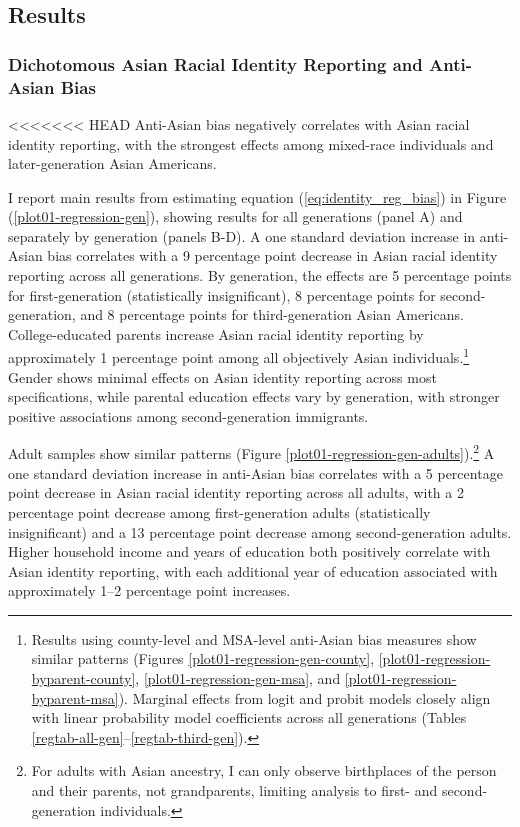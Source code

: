 \subsection{Results}\label{sec:results}

\subsubsection{Dichotomous Asian Racial Identity Reporting and Anti-Asian Bias}\label{sec:results-dichotomous}

<<<<<<< HEAD
Anti-Asian bias negatively correlates with Asian racial identity reporting, with the strongest effects among mixed-race individuals and later-generation Asian Americans.

I report main results from estimating equation (\ref{eq:identity_reg_bias}) in Figure (\ref{plot01-regression-gen}), showing results for all generations (panel A) and separately by generation (panels B-D). A one standard deviation increase in anti-Asian bias correlates with a 9 percentage point decrease in Asian racial identity reporting across all generations. By generation, the effects are 5 percentage points for first-generation (statistically insignificant), 8 percentage points for second-generation, and 8 percentage points for third-generation Asian Americans. College-educated parents increase Asian racial identity reporting by approximately 1 percentage point among all objectively Asian individuals.\footnote{Results using county-level and MSA-level anti-Asian bias measures show similar patterns (Figures \ref{plot01-regression-gen-county}, \ref{plot01-regression-byparent-county}, \ref{plot01-regression-gen-msa}, and \ref{plot01-regression-byparent-msa}). Marginal effects from logit and probit models closely align with linear probability model coefficients across all generations (Tables \ref{regtab-all-gen}--\ref{regtab-third-gen}).} Gender shows minimal effects on Asian identity reporting across most specifications, while parental education effects vary by generation, with stronger positive associations among second-generation immigrants.

Adult samples show similar patterns (Figure \ref{plot01-regression-gen-adults}).\footnote{For adults with Asian ancestry, I can only observe birthplaces of the person and their parents, not grandparents, limiting analysis to first- and second-generation individuals.} A one standard deviation increase in anti-Asian bias correlates with a 5 percentage point decrease in Asian racial identity reporting across all adults, with a 2 percentage point decrease among first-generation adults (statistically insignificant) and a 13 percentage point decrease among second-generation adults. Higher household income and years of education both positively correlate with Asian identity reporting, with each additional year of education associated with approximately 1--2 percentage point increases.

